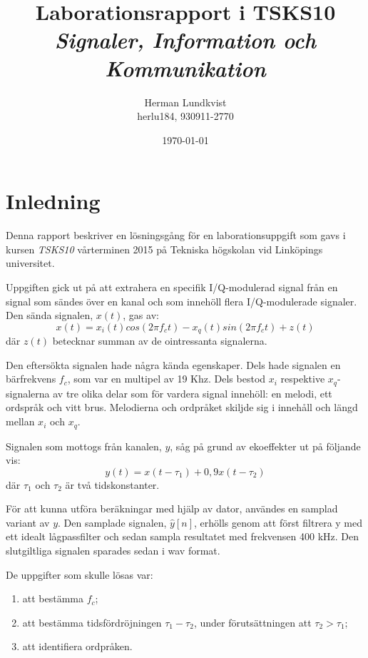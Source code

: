 \documentclass[10pt,twocolumn]{article}
\title{Laborationsrapport i TSKS10 \emph{Signaler, Information och Kommunikation}}
\author{Herman Lundkvist \\ herlu184, 930911-2770 }
\date{\today}
\begin{document}
\newcommand{\yhat}{$\hat{y}[n]$}

\maketitle

\section{Inledning}

Denna rapport beskriver en lösningsgång för en laborationsuppgift som gavs i
kursen \emph{TSKS10} vårterminen 2015 på Tekniska högskolan vid Linköpings
universitet.

Uppgiften gick ut på att extrahera en specifik I/Q-modulerad signal från en signal som sändes
över en kanal och som innehöll flera I/Q-modulerade signaler. Den sända signalen, $x(t)$, gas av:
\begin{equation}
x(t) = x_i(t) cos(2 \pi f_ct) - x_q(t) sin(2 \pi f_c t) + z(t)
\label{e1}
\end{equation}
där $z(t)$ betecknar summan av de ointressanta signalerna.

Den eftersökta signalen hade några kända egenskaper. Dels hade signalen en
bärfrekvens $f_c$, som var en multipel av 19 Khz. Dels bestod $x_i$ respektive
$x_q$-signalerna av tre olika delar som för vardera signal innehöll: en melodi, ett ordspråk
och vitt brus. Melodierna och ordpråket skiljde sig i
innehåll och längd mellan $x_i$ och $x_q$.

Signalen som mottogs från kanalen, $y$, såg på grund av ekoeffekter ut på
följande vis:
\begin{equation}
    y(t)=x(t - \tau_1) + 0,9 x(t - \tau_2)
\end{equation}
där $\tau_1$ och $\tau_2$ är två tidskonstanter.

För att kunna utföra beräkningar med hjälp av dator, användes en samplad
variant av $y$. Den samplade signalen, \yhat, erhölls genom att först
filtrera y med ett idealt lågpassfilter och sedan sampla resultatet med
frekvensen 400 kHz. Den slutgiltliga signalen sparades sedan i wav format.

De uppgifter som skulle lösas var:
\begin{enumerate}
\item att bestämma $f_c$;
\item att bestämma tidsfördröjningen $\tau_1-\tau_2$, under förutsättningen att
$\tau_2 > \tau_1$;
\item att identifiera ordpråken.
\end{enumerate}
\end{document}
